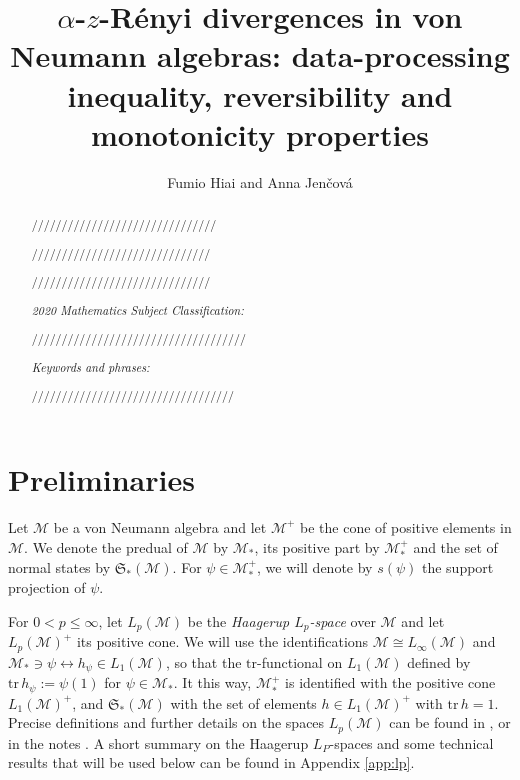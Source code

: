 \documentclass[12pt]{article}
\title{$\alpha$-$z$-R\'enyi divergences in von Neumann algebras:
data-processing inequality, reversibility and monotonicity properties}
\author{Fumio Hiai and Anna Jen\v cov\'a}
\theoremstyle{definition}
\theoremstyle{remark}
\numberwithin{equation}{section}
\def\Me{\mathcal M}
\def\Tr{\mathrm{tr}}
\def\states {\mathfrak S}
\begin{document}
\maketitle


\begin{abstract}

///////////////////////////////

//////////////////////////////

//////////////////////////////

\bigskip\noindent
{\it 2020 Mathematics Subject Classification:}

////////////////////////////////////

\medskip\noindent
{\it Keywords and phrases:}

//////////////////////////////////

\end{abstract}


\tableofcontents




\section{Preliminaries}



Let $\Me$ be a von Neumann algebra and let $\Me^+$ be the cone of positive elements in $\Me$. We
denote the predual of $\Me$ by $\Me_*$, its positive part by $\Me_*^+$ and the set of normal states by
$\states_*(\Me)$. For $\psi\in \Me_*^+$, we will denote by $s(\psi)$ the support projection  of $\psi$.

For $0< p\le \infty$, let $L_p(\Me)$ be the \emph{Haagerup $L_p$-space}
\cite{haagerup1979lpspaces,terp1981lpspaces} over $\Me$ and let $L_p(\Me)^+$ its positive cone. We will
use the identifications $\Me\cong L_\infty(\Me)$ and $\Me_*\ni \psi \leftrightarrow h_\psi\in L_1(\Me)$,
so that the $\Tr$-functional on $L_1(\Me)$ defined by $\Tr\,h_\psi:=\psi(1)$ for $\psi\in \Me_*$. It this way,
$\Me_*^+$ is identified with the positive cone $L_1(\Me)^+$, and $\states_*(\Me)$ with the set of elements
$h\in L_1(\Me)^+$ with $\Tr\,h=1$. Precise definitions and further details on the spaces $L_p(\Me)$ can be
found in \cite[Chap.~9]{hiai2021lectures}, or in the notes \cite{terp1981lpspaces}. {A short summary
on the Haagerup $L_P$-spaces and} some technical results that will be used below can be found in
Appendix \ref{app:lp}.
\end{document}
